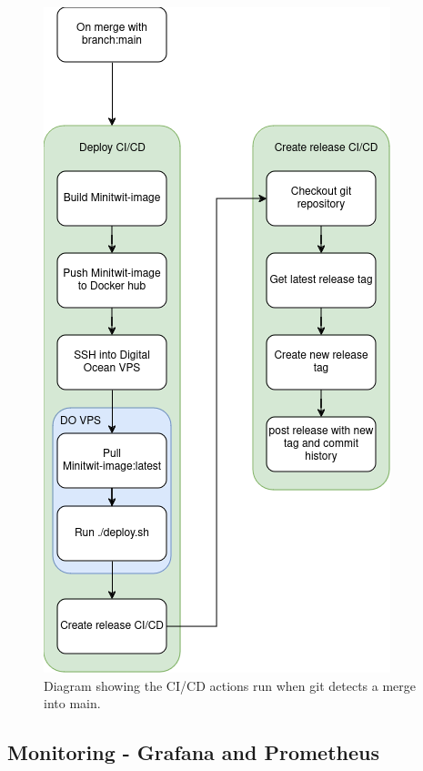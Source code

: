 \begin{figure}[H]
    \centering
    \includegraphics[scale=.5]{diagrams/MergeMain_CICD.png}
    \caption{Diagram showing the CI/CD actions run when git detects a merge into main.}
    \label{fig:merge with main ci/cd}
\end{figure}


\subsection{Monitoring - Grafana and Prometheus}

